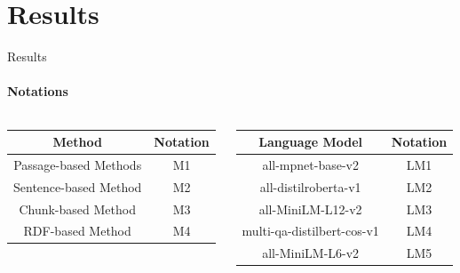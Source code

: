 \documentclass[aspectratio=169]{beamer}
\begin{document}
\section{Results}
\begin{frame}{Results}
	\framesubtitle{Notations}
	\begin{columns}
		\begin{column}{0.5\textwidth}
			\begin{table}
				\centering
				\begin{tabular}{|c|c|}
					\hline
					\rowcolor{Gray}
					Method & Notation\\
					\hline
					Passage-based Methods & M1\\
					\hline
					Sentence-based Method & M2\\
					\hline
					Chunk-based Method & M3\\
					\hline
					RDF-based Method & M4\\
					\hline
				\end{tabular}
			\end{table}
		\end{column}
	\begin{column}{0.5\textwidth}
		\begin{table}
			\centering
			\begin{tabular}{|c|c|}
				\hline
				\rowcolor{Gray}
				Language Model & Notation\\
				\hline
				all-mpnet-base-v2 & LM1\\
				\hline
				all-distilroberta-v1 & LM2\\
				\hline
				all-MiniLM-L12-v2 & LM3\\
				\hline
				multi-qa-distilbert-cos-v1 & LM4\\
				\hline
				all-MiniLM-L6-v2 & LM5\\
				\hline
				
			\end{tabular}
		\end{table}
	\end{column}
	\end{columns}
	
\end{frame}
\end{document}
